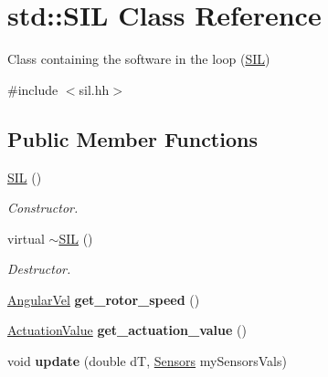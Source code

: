 \hypertarget{classstd_1_1SIL}{\section{std\-:\-:\-S\-I\-L \-Class \-Reference}
\label{classstd_1_1SIL}
}


\-Class containing the software in the loop (\hyperlink{classstd_1_1SIL}{\-S\-I\-L})  




{\ttfamily \#include $<$sil.\-hh$>$}

\subsection*{\-Public \-Member \-Functions}
\begin{DoxyCompactItemize}
\item 
\hypertarget{classstd_1_1SIL_a0e195277d2e26a6ce681b1d84dbe72a6}{\hyperlink{classstd_1_1SIL_a0e195277d2e26a6ce681b1d84dbe72a6}{\-S\-I\-L} ()}\label{classstd_1_1SIL_a0e195277d2e26a6ce681b1d84dbe72a6}

\begin{DoxyCompactList}\small\item\em \-Constructor. \end{DoxyCompactList}\item 
\hypertarget{classstd_1_1SIL_aa9c8c439c3fa725fe59f2245c274a369}{virtual \hyperlink{classstd_1_1SIL_aa9c8c439c3fa725fe59f2245c274a369}{$\sim$\-S\-I\-L} ()}\label{classstd_1_1SIL_aa9c8c439c3fa725fe59f2245c274a369}

\begin{DoxyCompactList}\small\item\em \-Destructor. \end{DoxyCompactList}\item 
\hypertarget{classstd_1_1SIL_a15370199edeb534b96ac2fb7fc97362a}{\hyperlink{classAngularVel}{\-Angular\-Vel} {\bfseries get\-\_\-rotor\-\_\-speed} ()}\label{classstd_1_1SIL_a15370199edeb534b96ac2fb7fc97362a}

\item 
\hypertarget{classstd_1_1SIL_ab8cf426f7dea5d0db0e828befe470cdc}{\hyperlink{classActuationValue}{\-Actuation\-Value} {\bfseries get\-\_\-actuation\-\_\-value} ()}\label{classstd_1_1SIL_ab8cf426f7dea5d0db0e828befe470cdc}

\item 
\hypertarget{classstd_1_1SIL_a6a7c1fe2a8b2e251c392569129fc06ea}{void {\bfseries update} (double d\-T, \hyperlink{classSensors}{\-Sensors} my\-Sensors\-Vals)}\label{classstd_1_1SIL_a6a7c1fe2a8b2e251c392569129fc06ea}

\end{DoxyCompactItemize}
